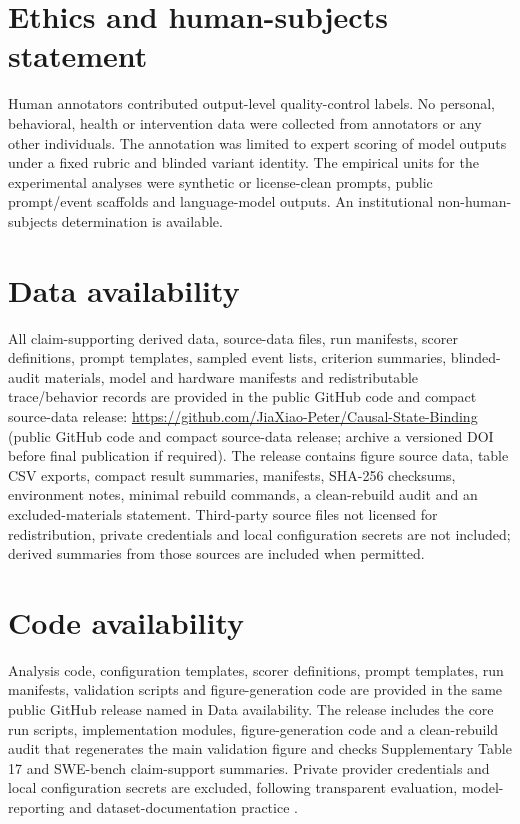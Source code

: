 ﻿\documentclass[preprint,12pt,authoryear]{elsarticle}
\newcommand{\reviewarchiveurl}{\url{https://github.com/JiaXiao-Peter/Causal-State-Binding}}
\newcommand{\reviewarchivestatus}{public GitHub code and compact source-data release; archive a versioned DOI before final publication if required}
\begin{document}
\section*{Ethics and human-subjects statement}

Human annotators contributed output-level quality-control labels. No personal, behavioral, health or intervention data were collected from annotators or any other individuals. The annotation was limited to expert scoring of model outputs under a fixed rubric and blinded variant identity. The empirical units for the experimental analyses were synthetic or license-clean prompts, public prompt/event scaffolds and language-model outputs. An institutional non-human-subjects determination is available.

\section*{Data availability}

All claim-supporting derived data, source-data files, run manifests, scorer definitions, prompt templates, sampled event lists, criterion summaries, blinded-audit materials, model and hardware manifests and redistributable trace/behavior records are provided in the public GitHub code and compact source-data release: \reviewarchiveurl{} (\reviewarchivestatus). The release contains figure source data, table CSV exports, compact result summaries, manifests, SHA-256 checksums, environment notes, minimal rebuild commands, a clean-rebuild audit and an excluded-materials statement. Third-party source files not licensed for redistribution, private credentials and local configuration secrets are not included; derived summaries from those sources are included when permitted.

\section*{Code availability}

Analysis code, configuration templates, scorer definitions, prompt templates, run manifests, validation scripts and figure-generation code are provided in the same public GitHub release named in Data availability. The release includes the core run scripts, implementation modules, figure-generation code and a clean-rebuild audit that regenerates the main validation figure and checks Supplementary Table 17 and SWE-bench claim-support summaries. Private provider credentials and local configuration secrets are excluded, following transparent evaluation, model-reporting and dataset-documentation practice \citep{liang2023helm,mitchell2019modelcards,gebru2021datasheets}.
\end{document}
